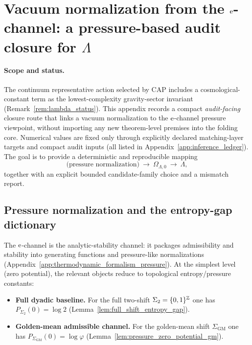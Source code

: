 \section{Vacuum normalization from the \texorpdfstring{$\mathrm{e}$}{e}-channel: a pressure-based audit closure for \texorpdfstring{$\Lambda$}{Lambda}}
\label{app:lambda_pressure_closure}

\paragraph{Scope and status.}
\InterfaceTag The continuum representative action selected by CAP includes a cosmological-constant term as the lowest-complexity gravity-sector invariant (Remark~\ref{rem:lambda_status}).
This appendix records a compact \emph{audit-facing} closure route that links a vacuum normalization to the $\mathrm{e}$-channel pressure viewpoint, without importing any new theorem-level premises into the folding core.
\MatchTag Numerical values are fixed only through explicitly declared matching-layer targets and compact audit inputs (all listed in Appendix~\ref{app:inference_ledger}).
\AuditTag The goal is to provide a deterministic and reproducible mapping
\[
\text{(pressure normalization)}\ \longrightarrow\ \Omega_{\Lambda,0}\ \longrightarrow\ \Lambda,
\]
together with an explicit bounded candidate-family choice and a mismatch report.

\subsection{Pressure normalization and the entropy-gap dictionary}
\label{subsec:lambda_pressure_entropy_gap_dictionary}

The $\mathrm{e}$-channel is the analytic-stability channel: it packages admissibility and stability into generating functions and pressure-like normalizations (Appendix~\ref{app:thermodynamic_formalism_pressure}).
At the simplest level (zero potential), the relevant objects reduce to topological entropy/pressure constants:

\begin{itemize}
\item \textbf{Full dyadic baseline.}
\MathTag For the full two-shift $\Sigma_2=\{0,1\}^{\mathbb{Z}}$ one has $P_{\Sigma_2}(0)=\log 2$ (Lemma~\ref{lem:full_shift_entropy_gap}).
\item \textbf{Golden-mean admissible channel.}
\MathTag For the golden-mean shift $\Sigma_{\mathrm{GM}}$ one has $P_{\Sigma_{\mathrm{GM}}}(0)=\log\varphi$ (Lemma~\ref{lem:pressure_zero_potential_gm}).
\end{itemize}

